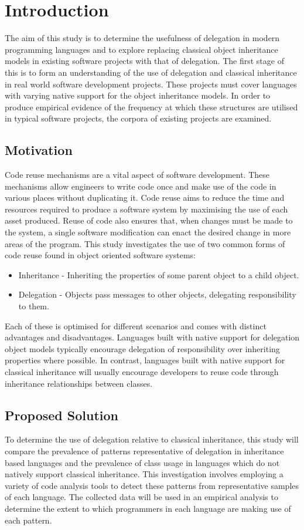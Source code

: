 \chapter{Introduction}\label{C:intro}
The aim of this study is to determine the usefulness of delegation in modern programming languages and to explore replacing classical object inheritance models in existing software projects with that of delegation. The first stage of this is to form an understanding of the use of delegation and classical inheritance in real world software development projects. These projects must cover languages with varying native support for the object inheritance models. In order to produce empirical evidence of the frequency at which these structures are utilised in typical software projects, the corpora of existing projects are examined.

\section{Motivation}
Code reuse mechanisms are a vital aspect of software development. These mechanisms allow engineers to write code once and make use of the code in various places without duplicating it. Code reuse aims to reduce the time and resources required to produce a software system by maximising the use of each asset produced. Reuse of code also ensures that, when changes must be made to the system, a single software modification can enact the desired change in more areas of the program.
\newline
This study investigates the use of two common forms of code reuse found in object oriented software systems:
\begin{itemize}
	\item Inheritance - Inheriting the properties of some parent object to a child object.
	\item Delegation - Objects pass messages to other objects, delegating responsibility to them.
\end{itemize}
Each of these is optimised for different scenarios and comes with distinct advantages and disadvantages. Languages built with native support for delegation object models typically encourage delegation of responsibility over inheriting properties where possible. In contrast, languages built with native support for classical inheritance will usually encourage developers to reuse code through inheritance relationships between classes.

\section{Proposed Solution}
To determine the use of delegation relative to classical inheritance, this study will compare the prevalence of patterns representative of delegation in inheritance based languages and the prevalence of class usage in languages which do not natively support classical inheritance. This investigation involves employing a variety of code analysis tools to detect these patterns from representative samples of each language. The collected data will be used in an empirical analysis to determine the extent to which programmers in each language are making use of each pattern.


